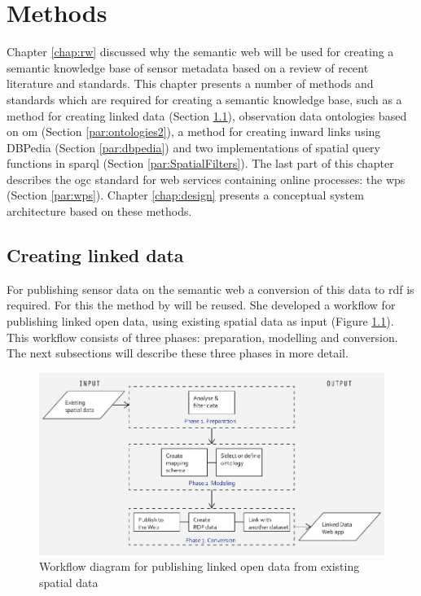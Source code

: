 


\chapter{Methods}
\label{chap:methods}

Chapter \ref{chap:rw} discussed why the semantic web will be used for creating a semantic knowledge base of sensor metadata based on a review of recent literature and standards. This chapter presents a number of methods and standards which are required for creating a semantic knowledge base, such as a method for creating linked data (Section \ref{par:missier}), observation data ontologies based on \ac{om} (Section \ref{par:ontologies2}), a method for creating inward links using DBPedia (Section \ref{par:dbpedia}) and two implementations of spatial query functions in \ac{sparql} (Section \ref{par:SpatialFilters}). The last part of this chapter describes the \ac{ogc} standard for web services containing online processes: the \acf{wps} (Section \ref{par:wps}). Chapter \ref{chap:design} presents a conceptual system architecture based on these methods. 

\section{Creating linked data}
\label{par:missier}
For publishing sensor data on the semantic web a conversion of this data to \ac{rdf} is required. For this the method by \cite{LD:Missier} will be reused. She developed a workflow for publishing linked open data, using existing spatial data as input (Figure \ref{fig:missier}). This workflow consists of three phases: preparation, modelling and conversion. The next subsections will describe these three phases in more detail.

\begin{figure}
	\centering
	\includegraphics[width=1\linewidth]{UML/workflowMissier.png}
	\caption{Workflow diagram for publishing linked open data from existing spatial data \citep[p. 28]{LD:Missier}}
	\label{fig:missier}
\end{figure}

